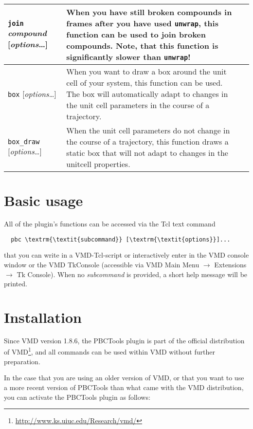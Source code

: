 \documentclass[a4paper, DIV12]{scrartcl}
\newcommand{\pbctools}{PBCTools\xspace}
\begin{document}
\begin{center}
\begin{tabular}{|p{}|p{}|r|}
    \texttt{join} \textit{compound} [\textit{options}\dots]
    & When you have still broken compounds in frames after you have
    used \texttt{unwrap}, this function can be used to join broken
    compounds. Note, that this function is significantly slower than
    \texttt{unwrap}!
    & \pageref{sec:join}
    \\\hline
  
    \texttt{box} [\textit{options}\dots]
    & When you want to draw a box around the unit cell of your system,
    this function can be used. The box will automatically adapt to
    changes in the unit cell parameters in the course of a trajectory.
    & \pageref{sec:box}
    \\\hline
  
    \texttt{box\_draw} [\textit{options}\dots]
    & When the unit cell parameters do not change in the course of a
    trajectory, this function draws a static box that will not adapt to
    changes in the unitcell properties.
    & \pageref{sec:box_draw}
    \\\hline
  \end{tabular}
\end{center}

\section{Basic usage}
All of the plugin's functions can be accessed via the Tcl text command

\begin{Verbatim}
  pbc \textrm{\textit{subcommand}} [\textrm{\textit{options}}]...
\end{Verbatim}

\noindent that you can write in a VMD-Tcl-script or interactively
enter in the VMD console window or the VMD TkConsole (accessible via
VMD Main Menu $\rightarrow$ Extensions $\rightarrow$ Tk Console).
When no \textit{subcommand} is provided, a short help message will be
printed.

\section{Installation}

Since VMD version 1.8.6, the \pbctools plugin is part of the official
distribution of
VMD\footnote{\url{http://www.ks.uiuc.edu/Research/vmd/}}, and all
commands can be used within VMD without further preparation.

In the case that you are using an older version of VMD, or that you
want to use a more recent version of \pbctools than what came with the
VMD distribution, you can activate the \pbctools plugin as follows:
\end{document}

